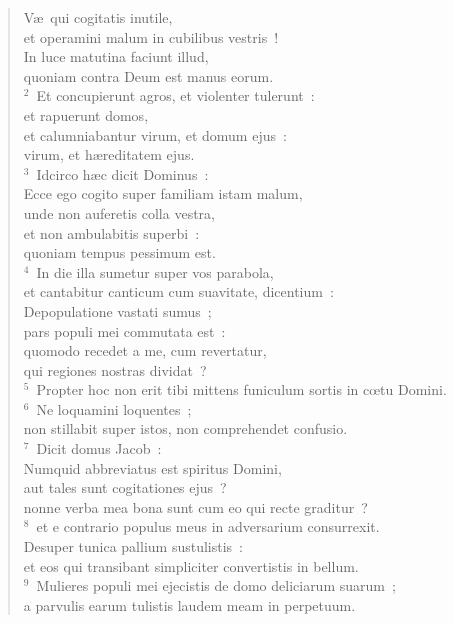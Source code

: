 \begin{flushleft}\begin{verse}\vspace{-19pt}V\ae\ qui cogitatis inutile,\\ et operamini malum in cubilibus vestris~!\\ In luce matutina faciunt illud,\\ quoniam contra Deum est manus eorum.\\
${}^{2}$~Et concupierunt agros, et violenter tulerunt~:\\ et rapuerunt domos,\\ et calumniabantur virum, et domum ejus~:\\ virum, et h\ae reditatem ejus.\\
${}^{3}$~Idcirco h\ae c dicit Dominus~:\\ Ecce ego cogito super familiam istam malum,\\ unde non auferetis colla vestra,\\ et non ambulabitis superbi~:\\ quoniam tempus pessimum est.\\
${}^{4}$~In die illa sumetur super vos parabola,\\ et cantabitur canticum cum suavitate, dicentium~:\\ Depopulatione vastati sumus~;\\ pars populi mei commutata est~:\\ quomodo recedet a me, cum revertatur,\\ qui regiones nostras dividat~?\\
${}^{5}$~Propter hoc non erit tibi mittens funiculum sortis in cœtu Domini.\\
${}^{6}$~Ne loquamini loquentes~;\\ non stillabit super istos, non comprehendet confusio.\\
${}^{7}$~Dicit domus Jacob~:\\ Numquid abbreviatus est spiritus Domini,\\ aut tales sunt cogitationes ejus~?\\ nonne verba mea bona sunt cum eo qui recte graditur~?\\
${}^{8}$~et e contrario populus meus in adversarium consurrexit.\\ Desuper tunica pallium sustulistis~:\\ et eos qui transibant simpliciter convertistis in bellum.\\
${}^{9}$~Mulieres populi mei ejecistis de domo deliciarum suarum~;\\ a parvulis earum tulistis laudem meam in perpetuum.\\

\end{verse}
\end{flushleft}
